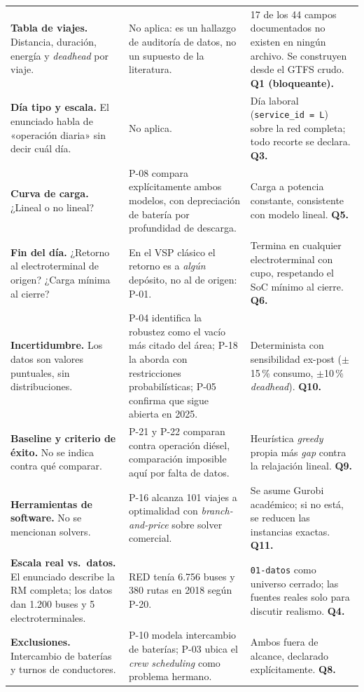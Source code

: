 \documentclass[11pt,a4paper,parskip=half]{scrartcl}
\begin{document}
\begin{landscape}
\begin{longtable}{@{}L{4.4cm}L{8.4cm}L{8.4cm}@{}}
\textbf{Tabla de viajes.} Distancia, duración, energía y \textit{deadhead} por viaje. &
No aplica: es un hallazgo de auditoría de datos, no un supuesto de la literatura. &
17 de los 44 campos documentados no existen en ningún archivo. Se construyen desde el GTFS crudo. \textbf{Q1 (bloqueante).} \\
\addlinespace
{}
\textbf{Día tipo y escala.} El enunciado habla de «operación diaria» sin decir cuál día. &
No aplica. &
Día laboral (\texttt{service\_id = L}) sobre la red completa; todo recorte se declara. \textbf{Q3.} \\
\addlinespace
\textbf{Curva de carga.} ¿Lineal o no lineal? &
P-08 compara explícitamente ambos modelos, con depreciación de batería por profundidad de descarga. &
Carga a potencia constante, consistente con modelo lineal. \textbf{Q5.} \\
\addlinespace
{}
\textbf{Fin del día.} ¿Retorno al electroterminal de origen? ¿Carga mínima al cierre? &
En el VSP clásico el retorno es a \emph{algún} depósito, no al de origen: P-01. &
Termina en cualquier electroterminal con cupo, respetando el SoC mínimo al cierre. \textbf{Q6.} \\
\addlinespace
\textbf{Incertidumbre.} Los datos son valores puntuales, sin distribuciones. &
P-04 identifica la robustez como el vacío más citado del área; P-18 la aborda con restricciones probabilísticas; P-05 confirma que sigue abierta en 2025. &
Determinista con sensibilidad ex-post ($\pm$15\,\% consumo, $\pm$10\,\% \textit{deadhead}). \textbf{Q10.} \\
\addlinespace
{}
\textbf{Baseline y criterio de éxito.} No se indica contra qué comparar. &
P-21 y P-22 comparan contra operación diésel, comparación imposible aquí por falta de datos. &
Heurística \textit{greedy} propia más \textit{gap} contra la relajación lineal. \textbf{Q9.} \\
\addlinespace
\textbf{Herramientas de software.} No se mencionan solvers. &
P-16 alcanza 101 viajes a optimalidad con \textit{branch-and-price} sobre solver comercial. &
Se asume Gurobi académico; si no está, se reducen las instancias exactas. \textbf{Q11.} \\
\addlinespace
{}
\textbf{Escala real vs.\ datos.} El enunciado describe la RM completa; los datos dan 1.200 buses y 5 electroterminales. &
RED tenía 6.756 buses y 380 rutas en 2018 según P-20. &
\texttt{01-datos} como universo cerrado; las fuentes reales solo para discutir realismo. \textbf{Q4.} \\
\addlinespace
\textbf{Exclusiones.} Intercambio de baterías y turnos de conductores. &
P-10 modela intercambio de baterías; P-03 ubica el \textit{crew scheduling} como problema hermano. &
Ambos fuera de alcance, declarado explícitamente. \textbf{Q8.} \\
\bottomrule
\end{longtable}

\end{landscape}

\clearpage
\renewcommand{\refname}{Referencias citadas}

\end{document}

